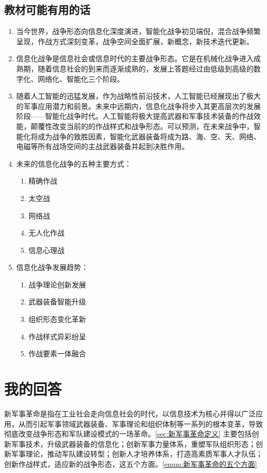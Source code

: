 \documentclass[lang=cn,newtx,12pt,scheme=chinese]{elegantbook}
\begin{document}
\subsection{教材可能有用的话}
\begin{enumerate}
  \item 当今世界，战争形态向信息化深度演进，智能化战争初见端倪，混合战争频繁呈现，作战方式深刻变革，战争空间全面扩展，新概念，新技术迭代更新。
  \item 信息化战争是信息社会或信息时代的主要战争形态。它是在机械化战争进入成熟期，随着信息社会的到来而逐渐成熟的，发展上答题经过由低级到高级的数字化、网络化、智能化三个阶段。 
  \item 随着人工智能的迅猛发展，作为战略性前沿技术，人工智能已经展现出了极大的军事应用潜力和前景。未来中远期内，信息化战争将步入其更高层次的发展阶段——智能化战争时代。人工智能将极大提高武器和军事技术装备的作战效能，颠覆性改变当前的的作战样式和战争形态。可以预测，在未来战争中，智能化将成为战争的致胜因素，智能化武器装备将成为路、海、空、天、网络、电磁等所有战场空间的主战武器装备并起到决胜作用。
  \item 未来的信息化战争的五种主要方式：\label{def:信息战的方式}
    \begin{enumerate}
      \item 精确作战
      \item 太空战
      \item 网络战  
      \item 无人化作战
      \item 信息心理战
    \end{enumerate}
  \item 信息化战争发展趋势：
    \begin{enumerate}
      \item 战争理论创新发展
      \item 武器装备智能升级
      \item 组织形态变化革新
      \item 作战样式异彩纷呈
      \item 作战要素一体融合
    \end{enumerate}
\end{enumerate}

\section{我的回答}
新军事革命是指在工业社会走向信息社会的时代，以信息技术为核心并得以广泛应用，从而引起军事领域武器装备、军事理论和组织体制等一系列的根本变革，导致彻底改变战争形态和军队建设模式的一场革命。\ref{sec:新军事革命定义}
主要包括创新军事技术，升级武器装备的信息化；创新军事力量体系，重塑军队组织形态；创新军事理论，推动军队建设转型；创新人才培养体系，打造高素质军事人才队伍；创新作战样式，适应新的战争形态，这五个方面。\ref{enum:新军事革命的五个方面}
\end{document}
